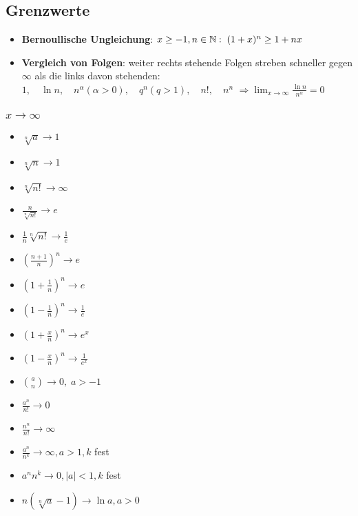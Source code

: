 \begin{multicols}{2}
\subsection{Grenzwerte}
\begin{itemize}[leftmargin=*]
	\item \textbf{Bernoullische Ungleichung}: $x \geq -1, n \in \mathbb{N}: \; (1+x)^n \geq
	1+nx$
	\item \textbf{Vergleich von Folgen}: weiter rechts stehende Folgen streben
	schneller gegen $\infty$ als die links davon stehenden: $1, \quad \ln n, \quad
	n^\alpha (\alpha > 0), \quad q^n (q > 1), \quad n!, \quad n^n$ $\Rightarrow
	\lim_{x \to \infty} \frac{\ln n}{n^\alpha} = 0$
\end{itemize}
\subsubsection{$x \rightarrow \infty$}
\begin{multicols}{2}
\begin{itemize}[leftmargin=*]
	\item $\sqrt[n]{a} \rightarrow 1$
	\item $\sqrt[n]{n} \rightarrow 1$
	\item $\sqrt[n]{n!} \rightarrow \infty$
	\item $\frac{n}{\sqrt[n]{n!}} \rightarrow e$
	\item $\frac{1}{n} \sqrt[n]{n!} \rightarrow \frac{1}{e}$
	\item $\left ( \frac{n+1}{n} \right )^n \rightarrow e$
	\item $\left ( 1 + \frac{1}{n} \right )^n \rightarrow e$
	\item $\left ( 1 - \frac{1}{n} \right )^n \rightarrow \frac{1}{e}$
	\item $\left ( 1 + \frac{x}{n} \right )^n \rightarrow e^x$
	\item $\left ( 1 - \frac{x}{n} \right )^n \rightarrow \frac{1}{e^x}$
	\item ${a \choose n} \rightarrow 0, \; a > -1$
	\item $\frac{a^n}{n!} \rightarrow 0$
	\item $\frac{n^n}{n!} \rightarrow \infty$
	\item $\frac{a^n}{n^k} \rightarrow \infty, a > 1, k$ fest
	\item $a^n n^k \rightarrow 0, |a| < 1, k$ fest
	\item $n(\sqrt[n]{a} - 1) \rightarrow \ln a, a > 0$
\end{itemize}
\end{multicols}

\end{multicols}
